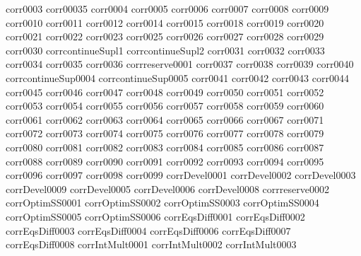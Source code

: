 {corr0003}
{corr00035}
{corr0004}
{corr0005}
{corr0006}
{corr0007}
{corr0008}
{corr0009}
{corr0010}
{corr0011}
{corr0012}
{corr0014}
{corr0015}
{corr0018}
{corr0019}
{corr0020}
{corr0021}
{corr0022}
{corr0023}
{corr0025}
{corr0026}
{corr0027}
{corr0028}
{corr0029}
{corr0030}
{corrcontinueSupl1}
{corrcontinueSupl2}
{corr0031}
{corr0032}
{corr0033}
{corr0034}
{corr0035}
{corr0036}
{corrreserve0001}
{corr0037}
{corr0038}
{corr0039}
{corr0040}
{corrcontinueSup0004}
{corrcontinueSup0005}
{corr0041}
{corr0042}
{corr0043}
{corr0044}
{corr0045}
{corr0046}
{corr0047}
{corr0048}
{corr0049}
{corr0050}
{corr0051}
{corr0052}
{corr0053}
{corr0054}
{corr0055}
{corr0056}
{corr0057}
{corr0058}
{corr0059}
{corr0060}
{corr0061}
{corr0062}
{corr0063}
{corr0064}
{corr0065}
{corr0066}
{corr0067}
{corr0071}
{corr0072}
{corr0073}
{corr0074}
{corr0075}
{corr0076}
{corr0077}
{corr0078}
{corr0079}
{corr0080}
{corr0081}
{corr0082}
{corr0083}
{corr0084}
{corr0085}
{corr0086}
{corr0087}
{corr0088}
{corr0089}
{corr0090}
{corr0091}
{corr0092}
{corr0093}
{corr0094}
{corr0095}
{corr0096}
{corr0097}
{corr0098}
{corr0099}
{corrDevel0001}
{corrDevel0002}
{corrDevel0003}
{corrDevel0009}
{corrDevel0005}
{corrDevel0006}
{corrDevel0008}
{corrreserve0002}
{corrOptimSS0001}
{corrOptimSS0002}
{corrOptimSS0003}
{corrOptimSS0004}
{corrOptimSS0005}
{corrOptimSS0006}
{corrEqsDiff0001}
{corrEqsDiff0002}
{corrEqsDiff0003}
{corrEqsDiff0004}
{corrEqsDiff0006}
{corrEqsDiff0007}
{corrEqsDiff0008}
{corrIntMult0001}
{corrIntMult0002}
{corrIntMult0003}
